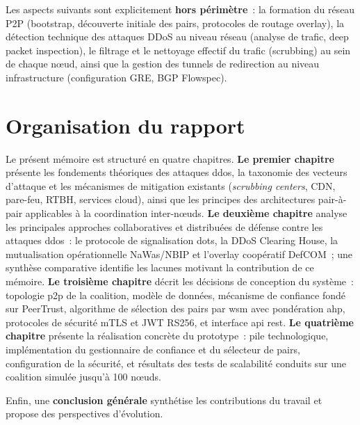Les aspects suivants sont explicitement \textbf{hors périmètre}~: la formation du réseau P2P (bootstrap, découverte initiale des pairs, protocoles de routage overlay), la détection technique des attaques DDoS au niveau réseau (analyse de trafic, deep packet inspection), le filtrage et le nettoyage effectif du trafic (scrubbing) au sein de chaque nœud, ainsi que la gestion des tunnels de redirection au niveau infrastructure (configuration GRE, BGP Flowspec).


\section*{Organisation du rapport}

Le présent mémoire est structuré en quatre chapitres. \textbf{Le premier chapitre} présente les fondements théoriques des attaques \gls{ddos}, la taxonomie des vecteurs d'attaque et les mécanismes de mitigation existants (\textit{scrubbing centers}, CDN, pare-feu, RTBH, services cloud), ainsi que les principes des architectures pair-à-pair applicables à la coordination inter-n\oe{}uds. \textbf{Le deuxième chapitre} analyse les principales approches collaboratives et distribuées de défense contre les attaques \gls{ddos}~: le protocole de signalisation \gls{dots}, la DDoS Clearing House, la mutualisation opérationnelle NaWas/NBIP et l'overlay coopératif DefCOM~; une synthèse comparative identifie les lacunes motivant la contribution de ce mémoire. \textbf{Le troisième chapitre} décrit les décisions de conception du système~: topologie \gls{p2p} de la coalition, modèle de données, mécanisme de confiance fondé sur PeerTrust, algorithme de sélection des pairs par \gls{wsm} avec pondération \gls{ahp}, protocoles de sécurité mTLS et JWT RS256, et interface \gls{api} \gls{rest}. \textbf{Le quatrième chapitre} présente la réalisation concrète du prototype~: pile technologique, implémentation du gestionnaire de confiance et du sélecteur de pairs, configuration de la sécurité, et résultats des tests de scalabilité conduits sur une coalition simulée jusqu'à 100 nœuds.

Enfin, une \textbf{conclusion générale} synthétise les contributions du travail et propose des perspectives d'évolution.